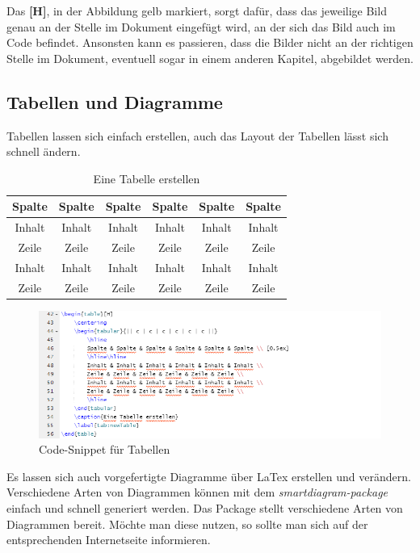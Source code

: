 Das \textbf{[H]}, in der Abbildung gelb markiert, sorgt dafür, dass das jeweilige Bild genau an der Stelle im Dokument eingefügt wird, an der sich das Bild auch im Code befindet. Ansonsten kann es passieren, dass die Bilder nicht an der richtigen Stelle im Dokument, eventuell sogar in einem anderen Kapitel, abgebildet werden.

\newpage
\subsection{Tabellen und Diagramme}
Tabellen lassen sich einfach erstellen, auch das Layout der Tabellen lässt sich schnell ändern.

\begin{table}[H]
	\centering
	\begin{tabular}{|| c | c | c | c | c | c ||}
	    \hline
		Spalte & Spalte & Spalte & Spalte & Spalte & Spalte \\ [0.5ex]
		\hline\hline
		Inhalt & Inhalt & Inhalt & Inhalt & Inhalt & Inhalt \\
		Zeile & Zeile & Zeile & Zeile & Zeile & Zeile \\
		Inhalt & Inhalt & Inhalt & Inhalt & Inhalt & Inhalt \\
		Zeile & Zeile & Zeile & Zeile & Zeile & Zeile \\
		\hline
	\end{tabular}
	\caption{Eine Tabelle erstellen}
	\label{tab:newTable}
\end{table}

\begin{figure}[H]
    \centering
    \includegraphics[width=\textwidth]{03_GraphicFiles/TabellenErstellen.PNG}
    \caption{Code-Snippet für Tabellen}
    \label{fig:createTable}
\end{figure}

Es lassen sich auch vorgefertigte Diagramme über LaTex erstellen und verändern. Verschiedene Arten von Diagrammen können mit dem \emph{smartdiagram-package} einfach und schnell generiert werden. Das Package stellt verschiedene Arten von Diagrammen bereit. Möchte man diese nutzen, so sollte man sich auf der entsprechenden Internetseite informieren. 

